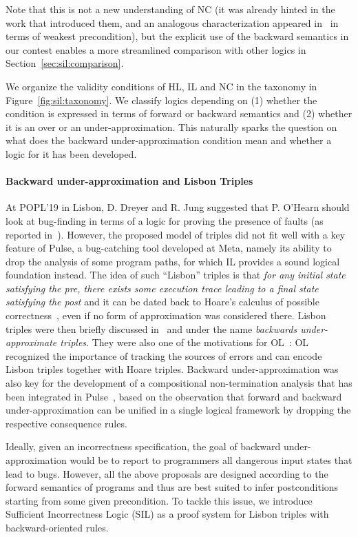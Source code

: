 Note that this is not a new understanding of NC (it was already hinted in the work that introduced them, and an analogous characterization appeared in~\cite[§6.3]{ZK22} in terms of weakest precondition), but the explicit use of the backward semantics in our contest enables a more streamlined comparison with other logics in Section~\ref{sec:sil:comparison}.

We organize the validity conditions of HL, IL and NC in the taxonomy in Figure~\ref{fig:sil:taxonomy}. We classify logics depending on (1) whether the condition is expressed in terms of forward or backward semantics and (2) whether it is an over or an under-approximation.
This naturally sparks the question on what does the backward under-approximation condition mean and whether a logic for it has been developed.

\paragraph{Backward under-approximation and Lisbon Triples}
At POPL'19 in Lisbon, D. Dreyer and R. Jung suggested that P. O'Hearn should look at bug-finding in terms of a logic for proving the presence of faults (as reported in~\cite{OHearn20,ZDS23}).
However, the proposed model of triples did not fit well with a key feature of Pulse, a bug-catching tool developed at Meta, namely its ability to drop the analysis of some program paths, for which IL provides a sound logical foundation instead.
The idea of such ``Lisbon'' triples is that \emph{for any initial state satisfying the pre, there exists some execution trace leading to a final state satisfying the post} and it can be dated back to Hoare's calculus of possible correctness~\cite{Hoare78}, even if no form of approximation was considered there.
Lisbon triples were then briefly discussed in~\cite[\S 5]{MOH21} and \cite[\S 3.2]{LRVBDO22} under the name \emph{backwards under-approximate triples}. They were also one of the motivations for OL~\cite{ZDS23}: OL recognized the importance of tracking the sources of errors and can encode Lisbon triples together with Hoare triples.
Backward under-approximation was also key for the development of a compositional non-termination analysis that has been integrated in Pulse~\cite{RVO24}, based on the observation that forward and backward under-approximation can be unified in a single logical framework by dropping the respective consequence rules.

Ideally, given an incorrectness specification, the goal of backward under-approximation would be to report to programmers all dangerous input states that lead to bugs.
However, all the above proposals are designed according to the forward semantics of programs and thus are best suited to infer postconditions starting from some given precondition. %
To tackle this issue, we introduce Sufficient Incorrectness Logic (SIL) as a proof system for Lisbon triples with backward\hyp{}oriented rules.

